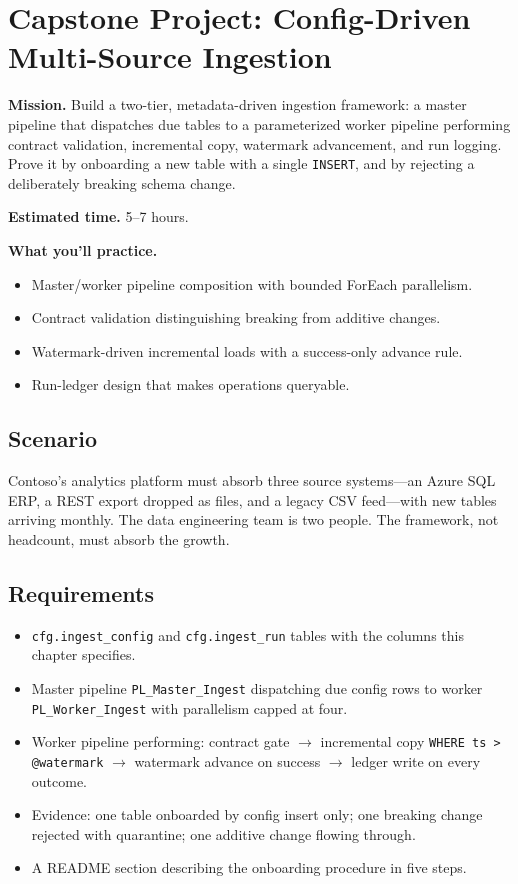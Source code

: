 \section{Capstone Project: Config-Driven Multi-Source Ingestion}\label{sec:ch9-capstone}

\begin{capstonebox}
\textbf{Mission.} Build a two-tier, metadata-driven ingestion framework: a master pipeline that dispatches due tables to a parameterized worker pipeline performing contract validation, incremental copy, watermark advancement, and run logging. Prove it by onboarding a new table with a single \texttt{INSERT}, and by rejecting a deliberately breaking schema change.

\textbf{Estimated time.} 5--7 hours.

\textbf{What you'll practice.}
\begin{itemize}
    \item Master/worker pipeline composition with bounded ForEach parallelism.
    \item Contract validation distinguishing breaking from additive changes.
    \item Watermark-driven incremental loads with a success-only advance rule.
    \item Run-ledger design that makes operations queryable.
\end{itemize}
\end{capstonebox}

\subsection*{Scenario}
Contoso's analytics platform must absorb three source systems---an Azure SQL ERP, a REST export dropped as files, and a legacy CSV feed---with new tables arriving monthly. The data engineering team is two people. The framework, not headcount, must absorb the growth.

\subsection*{Requirements}
\begin{itemize}
    \item \texttt{cfg.ingest\_config} and \texttt{cfg.ingest\_run} tables with the columns this chapter specifies.
    \item Master pipeline \texttt{PL\_Master\_Ingest} dispatching due config rows to worker \texttt{PL\_Worker\_Ingest} with parallelism capped at four.
    \item Worker pipeline performing: contract gate $\rightarrow$ incremental copy \texttt{WHERE ts > @watermark} $\rightarrow$ watermark advance on success $\rightarrow$ ledger write on every outcome.
    \item Evidence: one table onboarded by config insert only; one breaking change rejected with quarantine; one additive change flowing through.
    \item A README section describing the onboarding procedure in five steps.
\end{itemize}

